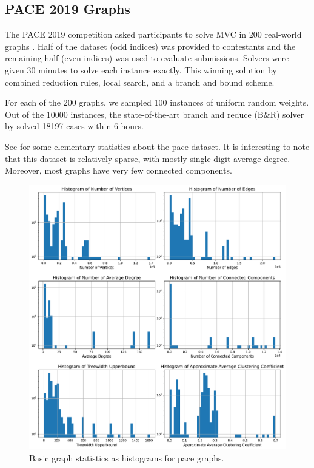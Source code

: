 \documentclass{article}
\begin{document}
\subsection{PACE 2019 Graphs}
The PACE 2019 competition asked participants to solve MVC in 200 real-world graphs \citet{pace2019}.
Half of the dataset (odd indices) was provided to contestants
and the remaining half (even indices) was used to evaluate submissions.
Solvers were given 30 minutes to solve each instance exactly.
This winning solution by \citet{wegotyoucovered} combined reduction rules,
local search, and a branch and bound scheme.

For each of the 200 graphs, we sampled 100 instances of uniform random weights.
Out of the 10000 instances,  
the state-of-the-art branch and reduce (B\&R) solver by \citet{kamis} solved 18197 cases within 6 hours.

See  for some elementary statistics about the pace dataset.
It is interesting to note that this dataset is relatively sparse,
with mostly single digit average degree.
Moreover, most graphs have very few connected components.

\begin{figure}
     \centering
     \includegraphics[width=\textwidth]{figures/pace_unweighted}
     \caption{Basic graph statistics as histograms for pace graphs.}
     \label{fig:pace_unweighted}
\end{figure}
\end{document}
